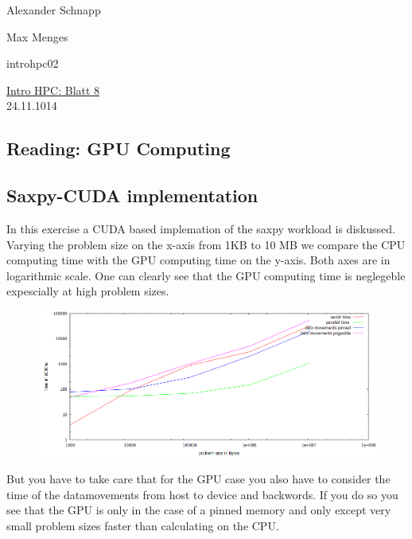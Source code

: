 \documentclass[a4paper,11pt]{scrartcl}
\begin{document}
\hfill Alexander Schnapp

\hfill Max Menges

\hfill introhpc02

\begin{center}
\underline{\Huge{Intro HPC: Blatt 8}}\\
\large{24.11.1014}\\
\end{center}


\subsection{Reading: GPU Computing}

\subsection{Saxpy-CUDA implementation}
In this exercise a CUDA based implemation of the saxpy workload is diskussed. Varying the problem size on the x-axis from 1KB to 10 MB
we compare the CPU computing time with the GPU computing time on the y-axis. Both axes are in logarithmic scale. One can clearly see that the GPU computing time is neglegeble expescially at high problem sizes.

\begin{figure}[htbp]
\includegraphics[width=\linewidth,
keepaspectratio]{vergleich}
\centering
\end{figure}

But you have to take care that for the GPU case you also have to consider the time of the datamovements from host to device and backwords. If you do so you see that the GPU is only in the case of a pinned memory and only except very small problem sizes faster than calculating on the CPU. 
\end{document}
